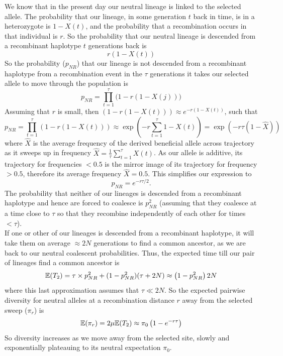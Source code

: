 We know that in the present day our neutral lineage is linked to
the selected allele. The probability that our lineage, in some
generation $t$ back in time, is in a heterozygote is $1-X(t)$, and the
probability that a recombination occurs in that individual is $r$. So
the probability that our neutral lineage is descended from a
recombinant haplotype $t$ generations back is 
\begin{equation}
r (1-X(t))
\end{equation}
So the probability ($p_{NR}$) that our lineage is not descended from a
recombinant haplotype 
from a recombination event in the
$\tau$ generations it takes our selected allele to move through the
population is
\begin{equation}
p_{NR}=\prod_{t=1}^{\tau} \big(1- r(1-X(j))\big)
\end{equation}
Assuming that $r$ is small, then $ \left(1- r(1-X(t))\right) \approx
e^{-r(1-X(t))}$,  such that
\begin{equation}
p_{NR}=\prod_{t=1}^{\tau} \left(1- r(1-X(t))\right) \approx \exp
\left( -r\sum_{t=1}^{\tau}
1- X(t) \right) =\exp
\left( -r \tau (1-\widehat{X}) \right)
\end{equation}
where
$\widehat{X}$ is the average frequency of the derived beneficial allele across  trajectory as it sweeps up in frequency
$\widehat{X} = \frac{1}{\tau}  \sum_{t=1}^{\tau}
 X(t)$. As our allele is additive, its trajectory for frequencies
 $<0.5$ is the mirror image of its trajectory for frequency $>0.5$, therefore its
average frequency $\widehat{X} =0.5$. This simplifies our expression to
\begin{equation}
p_{NR} = e^{-r \tau/2 }.
\end{equation}
The probability that neither of our lineages is descended from a
recombinant haplotype and hence are forced to coalesce is $p_{NR}^2$ (assuming that
they coalesce at a time close to $\tau$ so that they recombine
independently of each other for times $< \tau$).\\

If one or other of our lineages is descended from a recombinant haplotype, it will take them on average
$\approx 2N$ generations to find a common ancestor, as we are back to our
neutral coalescent probabilities. Thus, the expected time
till our pair of lineages find a common ancestor is
\begin{equation}
\mathbb{E}(T_2)  = \tau \times p_{NR}^2 +(1-p_{NR}^2) (\tau +2N) \approx
\left(1-p_{NR}^2 \right) 2N
\end{equation}
where this last approximation assumes that $\tau \ll 2N$. So the
expected pairwise diversity for neutral alleles at a recombination
distance $r$ away from the selected sweep ($\pi_r$) is
\begin{equation}
\mathbb{E}(\pi_r) = 2\mu \mathbb{E}(T_2)  \approx \pi_0 \left(1-e^{-r\tau} \right) \label{eqn:pi_HH}
\end{equation}
So diversity increases as we move away from the selected site,
slowly and exponentially plateauing to its neutral expectation $\pi_0$.\\


